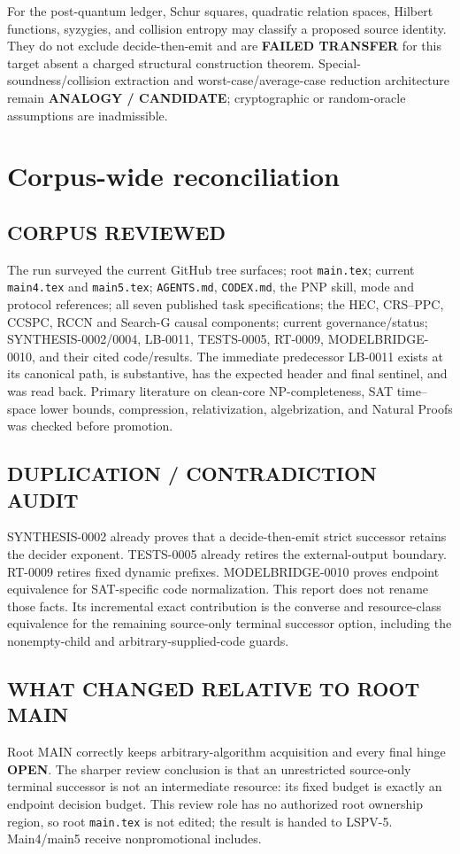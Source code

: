 \documentclass[11pt]{article}
\newcommand{\OPEN}{\textbf{OPEN}}
\begin{document}
For the post-quantum ledger, Schur squares, quadratic relation spaces, Hilbert
functions, syzygies, and collision entropy may classify a proposed source
identity.  They do not exclude decide-then-emit and are \textbf{FAILED
TRANSFER} for this target absent a charged structural construction theorem.
Special-soundness/collision extraction and worst-case/average-case reduction
architecture remain \textbf{ANALOGY / CANDIDATE}; cryptographic or
random-oracle assumptions are inadmissible.

\section{Corpus-wide reconciliation}

\subsection*{CORPUS REVIEWED}
The run surveyed the current GitHub tree surfaces; root \texttt{main.tex};
current \texttt{main4.tex} and \texttt{main5.tex}; \texttt{AGENTS.md},
\texttt{CODEX.md}, the PNP skill, mode and protocol references; all seven
published task specifications; the HEC, CRS--PPC, CCSPC, RCCN and Search-G
causal components; current governance/status; SYNTHESIS-0002/0004, LB-0011,
TESTS-0005, RT-0009, MODELBRIDGE-0010, and their cited code/results.  The
immediate predecessor LB-0011 exists at its canonical path, is substantive,
has the expected header and final sentinel, and was read back.  Primary
literature on clean-core NP-completeness, SAT time--space lower bounds,
compression, relativization, algebrization, and Natural Proofs was checked
before promotion.

\subsection*{DUPLICATION / CONTRADICTION AUDIT}
SYNTHESIS-0002 already proves that a decide-then-emit strict successor retains
the decider exponent.  TESTS-0005 already retires the external-output
boundary.  RT-0009 retires fixed dynamic prefixes.  MODELBRIDGE-0010 proves
endpoint equivalence for SAT-specific code normalization.  This report does
not rename those facts.  Its incremental exact contribution is the converse
and resource-class equivalence for the remaining source-only terminal
successor option, including the nonempty-child and arbitrary-supplied-code
guards.

\subsection*{WHAT CHANGED RELATIVE TO ROOT MAIN}
Root MAIN correctly keeps arbitrary-algorithm acquisition and every final
hinge \OPEN.  The sharper review conclusion is that an unrestricted
source-only terminal successor is not an intermediate resource: its fixed
budget is exactly an endpoint decision budget.  This review role has no
authorized root ownership region, so root \texttt{main.tex} is not edited;
the result is handed to LSPV-5.  Main4/main5 receive nonpromotional includes.
\end{document}
